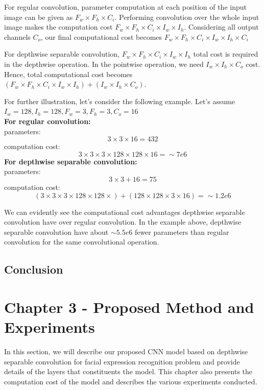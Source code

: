 \documentclass[master]{thesis-uestc}
\begin{document}
For regular convolution, parameter computation at each position of the input image can be given as $F_w \times F_h \times C_i$. Performing convolution over the whole input image makes the computation cost $F_w \times F_h \times C_i \times I_w \times I_h$. Considering all output channels $C_o$, our final computational cost becomes $F_w \times F_h \times C_i \times I_w \times I_h \times C_i$

For depthwise separable convolution, $F_w \times F_h \times C_i \times I_w \times I_h$ total cost is required in the depthwise operation. In the pointwise operation, we need $I_w \times I_h \times C_o$ cost. Hence, total computational cost becomes $(F_w \times F_h \times C_i \times I_w \times I_h) + (I_w \times I_h \times C_o)$.

For further illustration, let's consider the following example. Let's assume $I_w = 128, I_h = 128, F_w = 3, F_h = 3, C_o = 16$ \\
\textbf{For regular convolution:} \\
parameters:
\[3 \times 3 \times 16 = 432\]
computation cost:
\[3 \times 3 \times 3 \times 128 \times 128 \times 16 = \sim7e6\]
\textbf{For depthwise separable convolution:}\\
parameters:
\[3 \times 3 + 16 = 75 \]
computation cost:
\[(3 \times 3 \times 3 \times 128 \times 128 \times) + (128 \times 128 \times 3 \times 16) = \sim1.2e6 \]

We can evidently see the computational cost advantages depthwise separable convolution have over regular convolution. In the example above, depthwise separable convolution have about $\sim5.5e6$ fewer parameters than regular convolution for the same convolutional operation.

\section{Conclusion}

\chapter{Chapter 3 - Proposed Method and Experiments}
In this section, we will describe our proposed CNN model based on depthwise separable convolution for facial expression recognition problem and provide details of the layers that constituents the model. This chapter also presents the computation cost of the model and describes the various experiments conducted.
\end{document}
